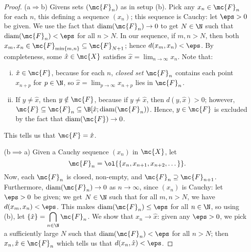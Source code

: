 \begin{proof}
	(a\(\Rightarrow\)b) Givens sets \((\mc{F}_n)\) as in setup (b). Pick any \(x_n\in\mc{F}_n\) for each \(n\), this defining a sequence \((x_n)\); this sequence is Cauchy: let \(\eps>0\) be given. We use the fact that \(\text{diam}(\mc{F}_n)\to 0\) to get \(N\in\N\) such that \(\text{diam}(\mc{F}_n)<\eps\) for all \(n>N\). In our sequence, if \(m,n>N\), then both \(x_m,x_n\in\mc{F}_{\min\{m,n\}}\subseteq\mc{F}_{N+1}\); hence \(d(x_m,x_n)<\eps\). By completeness, some \(\hat{x}\in\mc{X}\) satisfies \(\hat{x}=\displaystyle\lim_{n\to\infty}x_n\). Note that:
	\begin{enumerate}[(i)]
		\item \(\hat{x}\in\mc{F}\), because for each \(n\), \emph{closed set} \(\mc{F}_n\) contains each point \(x_{n+p}\) for \(p\in\N\), so \(\hat{x}=\displaystyle\lim_{p\to\infty}x_{n+p}\) lies in \(\mc{F}_n\).
		
		\item If \(y\neq\hat{x}\), then \(y\notin\mc{F}\), because if \(y\neq\hat{x}\), then \(d(y,\hat{x})>0\); however, \(\mc{F}\subseteq\mc{F}_n\subseteq\B[\hat{x};\text{diam}(\mc{F}_n))\). Hence, \(y\in\mc{F}\) is excluded by the fact that \(\text{diam}(\mc{F})\to 0\). 
	\end{enumerate}
	This tells us that \(\mc{F}=\hat{x}\).
	
	\medskip
	
	(b\(\implies\)a) Given a Cauchy sequence \((x_n)\) in \(\mc{X}\), let 
	\begin{equation*}
		\mc{F}_n=\ol{\{x_n,x_{n+1},x_{n+2},\dots\}}.
	\end{equation*}
	Now, each \(\mc{F}_n\) is closed, non-empty, and \(\mc{F}_n\supseteq\mc{F}_{n+1}\). Furthermore, \(\text{diam}(\mc{F}_n)\to 0\) as \(n\to\infty\), since \((x_n)\) is Cauchy: let \(\eps>0\) be given; we get \(N\in\N\) such that for all \(m,n>N\), we have \(d(x_m,x_n)<\eps\). This makes \(\text{diam}(\mc{F}_n)\leq\eps\) for all \(n\in\N\), so using (b), let \(\{\hat{x}\}=\displaystyle\bigcap_{n\in\N}\mc{F}_n\). We show that \(x_n\to\hat{x}\): given any \(\eps>0\), we pick a sufficiently large \(N\) such that \(\text{diam}(\mc{F}_n)<\eps\) for all \(n>N\); then \(x_n,\hat{x}\in\mc{F}_n\) which tells us that \(d(x_n,\hat{x})<\eps\).
\end{proof}

